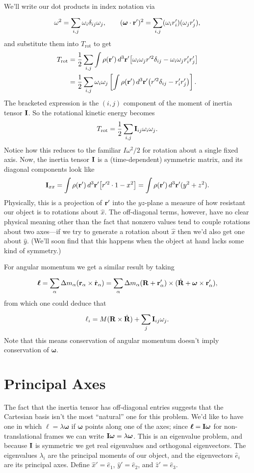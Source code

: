\documentclass[../p111main.tex]{subfiles}
\begin{document}
We'll write our dot products in index notation via
\[ \omega^2 = \sum_{i,j}^{} \omega_i \delta_{ij} \omega_j, \qquad (\bm \omega \cdot \mathbf{r}')^2 = \sum_{i,j}^{} (\omega_i r'_i) (\omega_j r'_j), \]
and substitute them into $T_\textrm{rot}$ to get
\begin{align*}
    T_\textrm{rot} &= \frac{1}{2} \sum_{i,j}^{} \int \rho(\mathbf{r}') \, d^3\mathbf{r}' \big[ \omega_i \omega_j r'^2 \delta_{ij} - \omega_i \omega_j r'_i r'_j \big] \\
    &= \frac{1}{2} \sum_{i,j}^{} \omega_i \omega_j \left[ \int \rho(\mathbf{r}') \, d^3 \mathbf{r}' \big( r'^2\delta_{ij} - r'_i r'_j \big) \right].
\end{align*}
The bracketed expression is the $(i,j)$ component of the moment of inertia tensor $\mathbf{I}$.
So the rotational kinetic energy becomes
\[ T_\textrm{rot} = \frac{1}{2} \sum_{i,j}^{} \mathbf{I}_{ij} \omega_i \omega_j. \]
Notice how this reduces to the familiar $I \omega^2 / 2$ for rotation about a single fixed axis.
Now, the inertia tensor $\mathbf{I}$ is a (time-dependent) symmetric matrix, and its diagonal components look like
\[ \mathbf{I}_{xx} = \int \rho(\mathbf{r}') \, d^3 \mathbf{r}' \big[ r'^2 \cdot 1 - x^2 \big] = \int \rho(\mathbf{r}') \, d^3 \mathbf{r}' (y^2 + z^2). \]
Physically, this is a projection of $\mathbf{r}'$ into the $yz$-plane a measure of how resistant our object is to rotations about $\hat x$.
The off-diagonal terms, however, have no clear physical meaning other than the fact that nonzero values tend to couple rotations about two axes---if we try to generate a rotation about $\hat x$ then we'd also get one about $\hat y$.
(We'll soon find that this happens when the object at hand lacks some kind of symmetry.)

For angular momentum we get a similar result by taking
\[ \bm \ell = \sum_{\alpha}^{} \Delta m_\alpha (\mathbf{r}_\alpha \times \dot{\mathbf{r}}_\alpha) = \sum_{\alpha}^{} \Delta m_\alpha (\mathbf{R} + \mathbf{r}_\alpha') \times (\dot{\mathbf{R}} + \bm \omega \times \mathbf{r}_\alpha'), \]
from which one could deduce that
\[ \ell_i = M (\mathbf{R} \times \dot{\mathbf{R}}) + \sum_{j}^{} \mathbf{I}_{ij} \omega_j. \]
Note that this means conservation of angular momentum doesn't imply conservation of $\bm \omega$.

\section{Principal Axes}
The fact that the inertia tensor has off-diagonal entries suggests that the Cartesian basis isn't the most ``natural'' one for this problem.
We'd like to have one in which $\bm \ell = \lambda \bm \omega$ if $\bm \omega$ points along one of the axes; since $\bm \ell = \mathbf{I} \bm \omega$ for non-translational frames we can write $\mathbf{I} \bm \omega = \lambda \bm \omega$.
This is an eigenvalue problem, and because $\mathbf{I}$ is symmetric we get real eigenvalues and orthogonal eigenvectors.
The eigenvalues $\lambda_i$ are the principal moments of our object, and the eigenvectors $\hat e_i$ are its principal axes.
Define $\hat x' = \hat e_1$, $\hat y' = \hat e_2$, and $\hat z' = \hat e_3$.
\end{document}
